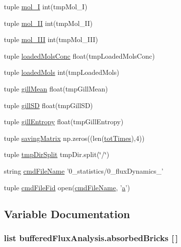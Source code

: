\begin{DoxyCompactItemize}
tuple \hyperlink{namespacebuffered_flux_analysis_a64e0bf7f508f99df9f78726bb69f39fc}{mol\-\_\-\-I} int(tmp\-Mol\-\_\-\-I)
\item 
tuple \hyperlink{namespacebuffered_flux_analysis_a608780773cb877189c0d288e25bbc3f3}{mol\-\_\-\-I\-I} int(tmp\-Mol\-\_\-\-I\-I)
\item 
tuple \hyperlink{namespacebuffered_flux_analysis_adb2a3012a89917afb7db45899a9b3e77}{mol\-\_\-\-I\-I\-I} int(tmp\-Mol\-\_\-\-I\-I\-I)
\item 
tuple \hyperlink{namespacebuffered_flux_analysis_a7e05b85cf7e9b63ac9aa0582932185b4}{loaded\-Mols\-Conc} float(tmp\-Loaded\-Mols\-Conc)
\item 
tuple \hyperlink{namespacebuffered_flux_analysis_ae753e3b6694200ad57523072a4a2dbf1}{loaded\-Mols} int(tmp\-Loaded\-Mols)
\item 
tuple \hyperlink{namespacebuffered_flux_analysis_ab95141737b50ec6e5b0e3f622dfa9713}{gill\-Mean} float(tmp\-Gill\-Mean)
\item 
tuple \hyperlink{namespacebuffered_flux_analysis_a74dcc41e82d94dda58e3e18fd94b9563}{gill\-S\-D} float(tmp\-Gill\-S\-D)
\item 
tuple \hyperlink{namespacebuffered_flux_analysis_ac596e19c308944b3c5504e92aa074de1}{gill\-Entropy} float(tmp\-Gill\-Entropy)
\item 
tuple \hyperlink{namespacebuffered_flux_analysis_a20f8e8350b77ca9121474e7177166800}{saving\-Matrix} np.\-zeros((len(\hyperlink{namespacebuffered_flux_analysis_a11c5182cf16d185b8ebd807aff4eb839}{tot\-Times}),4))
\item 
tuple \hyperlink{namespacebuffered_flux_analysis_ab710247ed928de0924b2123e6aec97c9}{tmp\-Dir\-Split} tmp\-Dir.\-split(\char`\"{}/\char`\"{})
\item 
string \hyperlink{namespacebuffered_flux_analysis_af2f4a5ec3f690f7a60ea69a5cb208359}{cmd\-File\-Name} '0\-\_\-statistics/0\-\_\-flux\-Dynamics\-\_\-'
\item 
tuple \hyperlink{namespacebuffered_flux_analysis_a6b17587fb0cc6eb8ae770e1dbc5b1d97}{cmd\-File\-Fid} open(\hyperlink{namespacebuffered_flux_analysis_af2f4a5ec3f690f7a60ea69a5cb208359}{cmd\-File\-Name}, '\hyperlink{somma_8m_a2ffdbad9ea59541e59cbd2b938e0770c}{a}')
\end{DoxyCompactItemize}


\subsection{Variable Documentation}
\hypertarget{namespacebuffered_flux_analysis_acd39b5831b0a3150487f722fa3941723}{
\subsubsection[{absorbed\-Bricks}]{\setlength{\rightskip}{0pt plus 5cm}list buffered\-Flux\-Analysis.\-absorbed\-Bricks \mbox{[}$\,$\mbox{]}}}\label{namespacebuffered_flux_analysis_acd39b5831b0a3150487f722fa3941723}


